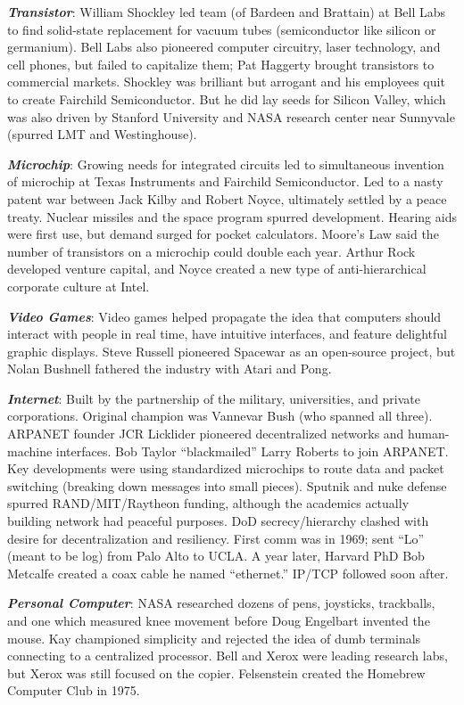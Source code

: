 \documentclass[
]{article}
\begin{document}
\textbf{\emph{Transistor}}: William Shockley led team (of Bardeen and
Brattain) at Bell Labs to find solid-state replacement for vacuum tubes
(semiconductor like silicon or germanium). Bell Labs also pioneered
computer circuitry, laser technology, and cell phones, but failed to
capitalize them; Pat Haggerty brought transistors to commercial markets.
Shockley was brilliant but arrogant and his employees quit to create
Fairchild Semiconductor. But he did lay seeds for Silicon Valley, which
was also driven by Stanford University and NASA research center near
Sunnyvale (spurred LMT and Westinghouse).

\textbf{\emph{Microchip}}: Growing needs for integrated circuits led to
simultaneous invention of microchip at Texas Instruments and Fairchild
Semiconductor. Led to a nasty patent war between Jack Kilby and Robert
Noyce, ultimately settled by a peace treaty. Nuclear missiles and the
space program spurred development. Hearing aids were first use, but
demand surged for pocket calculators. Moore's Law said the number of
transistors on a microchip could double each year. Arthur Rock developed
venture capital, and Noyce created a new type of anti-hierarchical
corporate culture at Intel.

\textbf{\emph{Video Games}}: Video games helped propagate the idea that
computers should interact with people in real time, have intuitive
interfaces, and feature delightful graphic displays. Steve Russell
pioneered Spacewar as an open-source project, but Nolan Bushnell
fathered the industry with Atari and Pong.

\textbf{\emph{Internet}}: Built by the partnership of the military,
universities, and private corporations. Original champion was Vannevar
Bush (who spanned all three). ARPANET founder JCR Licklider pioneered
decentralized networks and human-machine interfaces. Bob Taylor
``blackmailed'' Larry Roberts to join ARPANET. Key developments were
using standardized microchips to route data and packet switching
(breaking down messages into small pieces). Sputnik and nuke defense
spurred RAND/MIT/Raytheon funding, although the academics actually
building network had peaceful purposes. DoD secrecy/hierarchy clashed
with desire for decentralization and resiliency. First comm was in 1969;
sent ``Lo'' (meant to be log) from Palo Alto to UCLA. A year later,
Harvard PhD Bob Metcalfe created a coax cable he named ``ethernet.''
IP/TCP followed soon after.

\textbf{\emph{Personal Computer}}: NASA researched dozens of pens,
joysticks, trackballs, and one which measured knee movement before Doug
Engelbart invented the mouse. Kay championed simplicity and rejected the
idea of dumb terminals connecting to a centralized processor. Bell and
Xerox were leading research labs, but Xerox was still focused on the
copier. Felsenstein created the Homebrew Computer Club in 1975.
\end{document}
